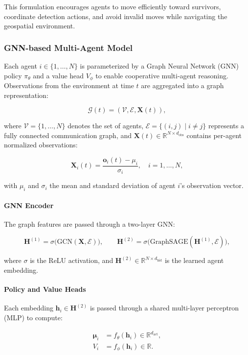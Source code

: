 \documentclass[conference]{IEEEtran}
\begin{document}
This formulation encourages agents to move efficiently toward survivors, coordinate detection actions, and avoid invalid moves while navigating the geospatial environment. \\

\subsubsection{GNN-based Multi-Agent Model}
Each agent \(i \in \{1, \dots, N\}\) is parameterized by a Graph Neural Network (GNN) policy \(\pi_\theta\) and a value head \(V_\phi\) to enable cooperative multi-agent reasoning. Observations from the environment at time \(t\) are aggregated into a graph representation:

\[
\mathcal{G}(t) = (\mathcal{V}, \mathcal{E}, \mathbf{X}(t)),
\]

where \(\mathcal{V} = \{1, \dots, N\}\) denotes the set of agents, \(\mathcal{E} = \{(i,j) \mid i \neq j \}\) represents a fully connected communication graph, and \(\mathbf{X}(t) \in \mathbb{R}^{N \times d_\text{obs}}\) contains per-agent normalized observations:

\[
\mathbf{X}_i(t) = \frac{\mathbf{o}_i(t) - \mu_i}{\sigma_i}, \quad i=1,\dots,N,
\]

with \(\mu_i\) and \(\sigma_i\) the mean and standard deviation of agent \(i\)'s observation vector.

\paragraph{GNN Encoder} The graph features are passed through a two-layer GNN:

\[
\mathbf{H}^{(1)} = \sigma \big( \text{GCN}(\mathbf{X}, \mathcal{E}) \big), \qquad
\mathbf{H}^{(2)} = \sigma \big( \text{GraphSAGE}(\mathbf{H}^{(1)}, \mathcal{E}) \big),
\]

where \(\sigma\) is the ReLU activation, and \(\mathbf{H}^{(2)} \in \mathbb{R}^{N \times d_\text{hid}}\) is the learned agent embedding.

\paragraph{Policy and Value Heads} Each embedding \(\mathbf{h}_i \in \mathbf{H}^{(2)}\) is passed through a shared multi-layer perceptron (MLP) to compute:

\[
\begin{aligned}
\boldsymbol{\mu}_i &= f_\theta(\mathbf{h}_i) \in \mathbb{R}^{d_\text{act}}, \\
V_i &= f_\phi(\mathbf{h}_i) \in \mathbb{R}.
\end{aligned}
\]
\end{document}
